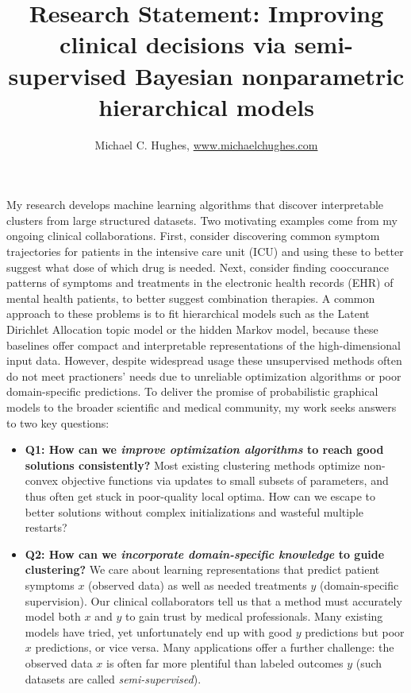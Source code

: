 \documentclass[11pt,letterpaper]{article}
\title{Research Statement: Improving clinical decisions via semi-supervised Bayesian nonparametric hierarchical models}
\author{Michael C. Hughes, %
    \url{www.michaelchughes.com}
}
\begin{document}
\maketitle

My research develops machine learning
algorithms that discover interpretable clusters from large structured datasets.
Two motivating examples come from my ongoing clinical collaborations.
First, consider 
discovering common symptom trajectories for patients in the intensive care unit (ICU) and using these to better suggest 
what dose of which drug is needed.
Next, consider finding cooccurance patterns of 
symptoms and treatments
in the electronic health records (EHR) of mental health patients, to better suggest combination therapies.
A common approach to these problems is to fit hierarchical models such as the 
Latent Dirichlet Allocation 
topic model or the hidden Markov model, because these baselines offer compact and interpretable representations of the high-dimensional input data.
However, despite widespread usage these unsupervised methods often do not meet practioners' needs due to
unreliable optimization algorithms
or 
poor domain-specific predictions.
To deliver the promise of probabilistic graphical models to the broader scientific and medical community, my work seeks answers to two key questions:

\begin{itemize}

\item \textbf{Q1: How can we \emph{improve optimization algorithms} to reach good solutions consistently?} Most existing clustering methods optimize non-convex objective functions via updates to small subsets of parameters, and thus often get stuck in poor-quality local optima.
How can we escape to better solutions without complex initializations and wasteful multiple restarts?

\item \textbf{Q2: How can we \emph{incorporate domain-specific knowledge} to guide clustering?}
We care about learning representations that predict patient symptoms $x$ (observed data) as well as needed treatments $y$ (domain-specific supervision). Our clinical collaborators tell us that a method must accurately model both $x$ and $y$ to gain trust by medical professionals. Many existing models have tried, yet unfortunately end up with good $y$ predictions but poor $x$ predictions, or vice versa. Many applications offer a further challenge: the observed data $x$ is often far more plentiful than labeled outcomes $y$ (such datasets are called \emph{semi-supervised}).
\end{itemize}
\end{document}
